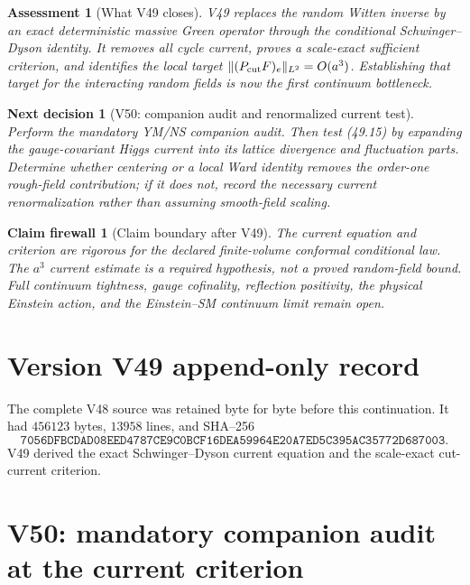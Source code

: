 \documentclass[11pt]{article}
\newtheorem{firewall}[theorem]{Claim firewall}
\newtheorem{decision}[theorem]{Next decision}
\newtheorem{assessment}[theorem]{Assessment}
\theoremstyle{remark}
\begin{document}
\begin{assessment}[What V49 closes]
\label{ass:v17v49-status}
V49 replaces the random Witten inverse by an exact deterministic
massive Green operator through the conditional Schwinger--Dyson
identity.  It removes all cycle current, proves a scale-exact
sufficient criterion, and identifies the local target
\(\|(P_{\rm cut}F)_e\|_{L^2}=O(a^3)\).  Establishing that target for
the interacting random fields is now the first continuum bottleneck.
\end{assessment}

\begin{decision}[V50: companion audit and renormalized current test]
\label{dec:v17v49-next}
Perform the mandatory YM/NS companion audit.  Then test (49.15) by
expanding the gauge-covariant Higgs current into its lattice divergence
and fluctuation parts.  Determine whether centering or a local Ward
identity removes the order-one rough-field contribution; if it does
not, record the necessary current renormalization rather than assuming
smooth-field scaling.
\end{decision}

\begin{firewall}[Claim boundary after V49]
\label{fire:v17v49}
The current equation and criterion are rigorous for the declared
finite-volume conformal conditional law.  The \(a^3\) current estimate
is a required hypothesis, not a proved random-field bound.  Full
continuum tightness, gauge cofinality, reflection positivity, the
physical Einstein action, and the Einstein--SM continuum limit remain
open.
\end{firewall}

\section*{Version V49 append-only record}
The complete V48 source was retained byte for byte before this
continuation.  It had \(456123\) bytes, \(13958\) lines, and SHA--256
\[
 \texttt{7056DFBCDAD08EED4787CE9C0BCF16DEA59964E20A7ED5C395AC35772D687003}.
\]
V49 derived the exact Schwinger--Dyson current equation and the
scale-exact cut-current criterion.


\section{V50: mandatory companion audit at the current criterion}
\label{sec:v17v50}
\end{document}
